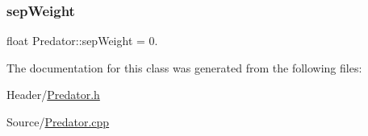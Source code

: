 \mbox{\label{class_predator_a69d8d2679a46ce9d30b49ca9df149c82}} 
\subsubsection{\texorpdfstring{sepWeight}{sepWeight}}
{\footnotesize\ttfamily float Predator\+::sep\+Weight = 0.}



The documentation for this class was generated from the following files\+:\begin{DoxyCompactItemize}
\item 
Header/\mbox{\hyperlink{_predator_8h}{Predator.\+h}}\item 
Source/\mbox{\hyperlink{_predator_8cpp}{Predator.\+cpp}}\end{DoxyCompactItemize}
